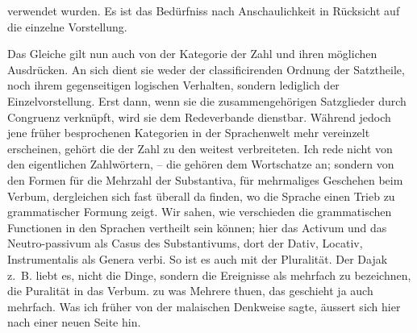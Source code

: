 verwendet wurden. Es ist das Bedürfniss nach Anschaulichkeit in Rücksicht auf die einzelne Vorstellung.

Das Gleiche gilt nun auch von der Kategorie der Zahl und ihren möglichen Ausdrücken. An sich dient sie weder der classificirenden Ordnung der Satztheile, noch ihrem gegenseitigen logischen Verhalten, \label{fp.425} sondern lediglich der Einzelvorstellung. Erst dann, wenn sie die zusammengehörigen Satzglieder durch Congruenz verknüpft, wird sie dem Redeverbande dienstbar. Während jedoch jene früher besprochenen Kategorien in der Sprachenwelt mehr vereinzelt erscheinen, gehört die der Zahl zu den weitest verbreiteten. Ich rede nicht von den eigentlichen Zahlwörtern, – die gehören dem Wortschatze an; sondern von den Formen für die Mehrzahl der Substantiva, für mehrmaliges Geschehen beim Verbum, dergleichen sich fast überall da finden, wo die Sprache einen Trieb zu \label{sp.446} grammatischer Formung zeigt. Wir sahen, wie verschieden die grammatischen Functionen in den Sprachen vertheilt sein können; hier das Activum und das Neutro-passivum als Casus des Substantivums, dort der Dativ, Locativ, Instrumentalis als Genera verbi. So ist es auch mit der Pluralität. Der Dajak z.~B. liebt es, nicht die Dinge, sondern die Ereignisse als mehrfach zu bezeichnen, die Puralität in das Verbum. zu   was Mehrere thuen, das geschieht ja auch mehrfach.  Was ich früher  von der malaischen Denkweise sagte, äussert sich hier nach einer neuen Seite hin.


